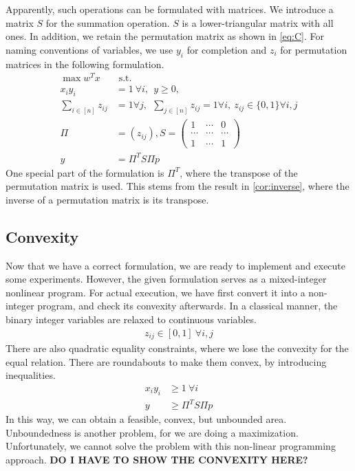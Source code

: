 \documentclass[12pt,letterpaper]{article}
\begin{document}
Apparently, such operations can be formulated with matrices. 
We introduce a matrix $S$ for the summation operation. $S$ is a lower-triangular matrix with all ones.
In addition, we retain the permutation matrix as shown in \ref{eq:C}.
For naming conventions of variables, we use $y_i$ for completion and $z_i$ for permutation matrices 
in the following formulation.
\begin{align*}
    \max w^Tx& \text{ s.t. } \label{eq:D} \tag{D} \\
 x_i y_i &= 1 \ \forall i, \ \ y \geq 0, \\ 
    \sum_{i \in [n]} z_{ij} &= 1 \forall j,  \ \ 
    \sum_{j \in [n]} z_{ij} = 1 \forall i,  \ z_{ij} \in \{0, 1\} \forall i, j \\ 
    \Pi &= (z_{ij}), S = \begin{pmatrix}
        1 & \cdots & 0 \\ 
        \cdots & \cdots & \cdots \\ 
        1 & \cdots & 1
    \end{pmatrix} \\
 y &= \Pi^T S \Pi p 
\end{align*}
One special part of the formulation is $\Pi^T$, where the transpose 
of the permutation matrix is used. This stems from the result in \ref{cor:inverse},
where the inverse of a permutation matrix is its transpose.

\subsection{Convexity}
Now that we have a correct formulation, we are ready to implement and execute some experiments.
However, the given formulation serves as a mixed-integer nonlinear program. 
For actual execution, we have first convert it into a non-integer program, and check its convexity afterwards.
In a classical manner, the binary integer variables are relaxed to continuous variables.
\begin{align*}
 z_{ij} \in [0, 1] \ \forall i, j
\end{align*}
There are also quadratic equality constraints, where we lose the convexity for the equal relation. 
There are roundabouts to make them convex, by introducing inequalities. 
\begin{align*}
 x_i y_i &\geq 1 \ \forall i \\
 y &\geq \Pi^T S \Pi p
\end{align*}
In this way, we can obtain a feasible, convex, but unbounded area. 
Unboundedness is another problem, for we are doing a maximization. 
Unfortunately, we cannot solve the problem with this non-linear programming approach. 
\textbf{DO I HAVE TO SHOW THE CONVEXITY HERE?}
\end{document}

